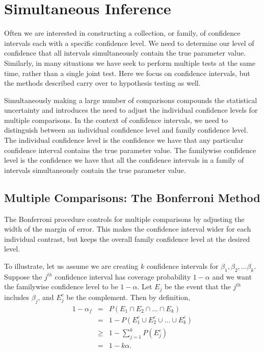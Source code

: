 \section{Simultaneous Inference}

Often we are interested in constructing a collection, or family, of confidence intervals each with a specific confidence level. We need to determine our level of confidence that all intervals simultaneously contain the true parameter value.
Similarly, in many situations we have seek to perform multiple tests at the same time, rather than a single joint test. Here we focus on confidence intervals, but the methods described carry over to hypothesis testing as well.


Simultaneously making a large number of comparisons compounds the statistical uncertainty and introduces the need to adjust the individual confidence levels for multiple comparisons.
In the context of confidence intervals, we need to distinguish between an individual confidence level and family confidence level. The individual confidence level is the confidence we have that any particular confidence interval contains the true parameter value.
The familywise confidence level is the confidence we have that all the confidence intervals in a family of intervals simultaneously contain the true parameter value.

\subsection{Multiple Comparisons: The Bonferroni Method}

The Bonferroni procedure controls for multiple comparisons by adjusting the width of the margin of error. 
This makes the confidence interval wider for each individual contrast, but keeps the overall family confidence level at the desired level.

To illustrate, let us assume we are creating $k$ confidence intervals for $\beta_1, \beta_2, \ldots \beta_k$. 
Suppose the $j^{th}$ confidence interval has coverage probability $1-\alpha$ and we want the familywise confidence level to be $1-\alpha$.
Let $E_j$ be the event that the $j^{th}$ includes $\beta_j$, and $E_j^c$ be the complement. Then by definition,
\begin{eqnarray*}
1- \alpha_f &=& P(E_1 \cap E_2 \cap \ldots \cap E_k) \\
&=& 1 - P(E_1^c \cup E_2^c \cup \ldots \cup E_k^c) \\
& \geq & 1 -  \sum_{j=1}^k P(E_j^c) \\
&=&  1 - k \alpha.
\end{eqnarray*}
 

